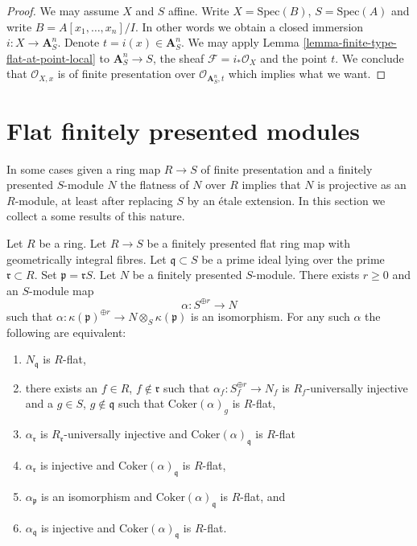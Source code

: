 \begin{proof}
We may assume $X$ and $S$ affine. Write $X = \text{Spec}(B)$,
$S = \text{Spec}(A)$ and write $B = A[x_1, \ldots, x_n]/I$.
In other words we obtain a closed immersion $i : X \to \mathbf{A}^n_S$.
Denote $t = i(x) \in \mathbf{A}^n_S$. We may apply
Lemma \ref{lemma-finite-type-flat-at-point-local}
to $\mathbf{A}^n_S \to S$, the sheaf $\mathcal{F} = i_*\mathcal{O}_X$
and the point $t$. We conclude that $\mathcal{O}_{X, x}$ is 
of finite presentation over $\mathcal{O}_{\mathbf{A}^n_S, t}$
which implies what we want.
\end{proof}


\section{Flat finitely presented modules}
\label{section-finitely-presented-flat}

\noindent
In some cases given a ring map $R \to S$ of finite presentation and
a finitely presented $S$-module $N$ the flatness of $N$ over $R$ implies
that $N$ is projective as an $R$-module, at least after replacing $S$
by an \'etale extension. In this section we collect a some results
of this nature.

\begin{lemma}
\label{lemma-induction-step-fp}
Let $R$ be a ring. Let $R \to S$ be a finitely presented
flat ring map with geometrically integral fibres. Let
$\mathfrak q \subset S$ be a prime ideal lying over the prime
$\mathfrak r \subset R$. Set $\mathfrak p = \mathfrak r S$.
Let $N$ be a finitely presented $S$-module.
There exists $r \geq 0$ and an $S$-module map
$$
\alpha : S^{\oplus r} \longrightarrow N
$$
such that
$\alpha : \kappa(\mathfrak p)^{\oplus r} \to N \otimes_S \kappa(\mathfrak p)$
is an isomorphism. For any such $\alpha$ the following are equivalent:
\begin{enumerate}
\item $N_{\mathfrak q}$ is $R$-flat,
\item there exists an $f \in R$, $f \not \in \mathfrak r$ such that
$\alpha_f : S_f^{\oplus r} \to N_f$ is $R_f$-universally injective and
a $g \in S$, $g \not \in \mathfrak q$ such that $\text{Coker}(\alpha)_g$
is $R$-flat,
\item $\alpha_{\mathfrak r}$ is $R_{\mathfrak r}$-universally injective and
$\text{Coker}(\alpha)_{\mathfrak q}$ is $R$-flat
\item $\alpha_{\mathfrak r}$ is injective and
$\text{Coker}(\alpha)_{\mathfrak q}$ is $R$-flat,
\item $\alpha_{\mathfrak p}$ is an isomorphism and
$\text{Coker}(\alpha)_{\mathfrak q}$ is $R$-flat, and
\item $\alpha_{\mathfrak q}$ is injective and
$\text{Coker}(\alpha)_{\mathfrak q}$ is $R$-flat.
\end{enumerate}
\end{lemma}

